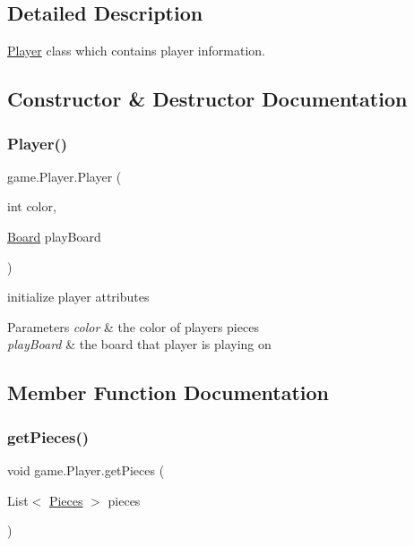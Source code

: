 \subsection{Detailed Description}
\mbox{\hyperlink{classgame_1_1_player}{Player}} class which contains player information. 

\subsection{Constructor \& Destructor Documentation}
\mbox{\label{classgame_1_1_player_ab50e8fdec094890642f652d2529356e7}} 
\subsubsection{\texorpdfstring{Player()}{Player()}}
{\footnotesize\ttfamily game.\+Player.\+Player (\begin{DoxyParamCaption}\item[{int}]{color,  }\item[{\mbox{\hyperlink{classgame_1_1_board}{Board}}}]{play\+Board }\end{DoxyParamCaption})\hspace{0.3cm}{\ttfamily [inline]}}

initialize player attributes 
\begin{DoxyParams}{Parameters}
{\em color} & the color of player\textquotesingle{}s pieces \\
\hline
{\em play\+Board} & the board that player is playing on \\
\hline
\end{DoxyParams}


\subsection{Member Function Documentation}
\mbox{\label{classgame_1_1_player_a936532b865afe0eb13cf4bbc490c78f8}} 
\subsubsection{\texorpdfstring{get\+Pieces()}{getPieces()}}
{\footnotesize\ttfamily void game.\+Player.\+get\+Pieces (\begin{DoxyParamCaption}\item[{List$<$ \mbox{\hyperlink{classpieces_1_1_pieces}{Pieces}} $>$}]{pieces }\end{DoxyParamCaption})\hspace{0.3cm}{\ttfamily [inline]}}

